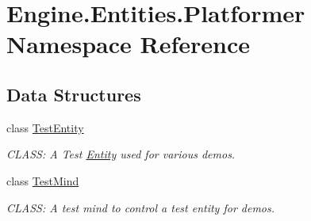 \hypertarget{a00243}{}\section{Engine.\+Entities.\+Platformer Namespace Reference}
\label{a00243}
\subsection*{Data Structures}
\begin{DoxyCompactItemize}
\item 
class \hyperlink{a00330}{Test\+Entity}
\begin{DoxyCompactList}\small\item\em C\+L\+A\+SS\+: A Test \hyperlink{a00314}{Entity} used for various demos. \end{DoxyCompactList}\item 
class \hyperlink{a00334}{Test\+Mind}
\begin{DoxyCompactList}\small\item\em C\+L\+A\+SS\+: A test mind to control a test entity for demos. \end{DoxyCompactList}\end{DoxyCompactItemize}
